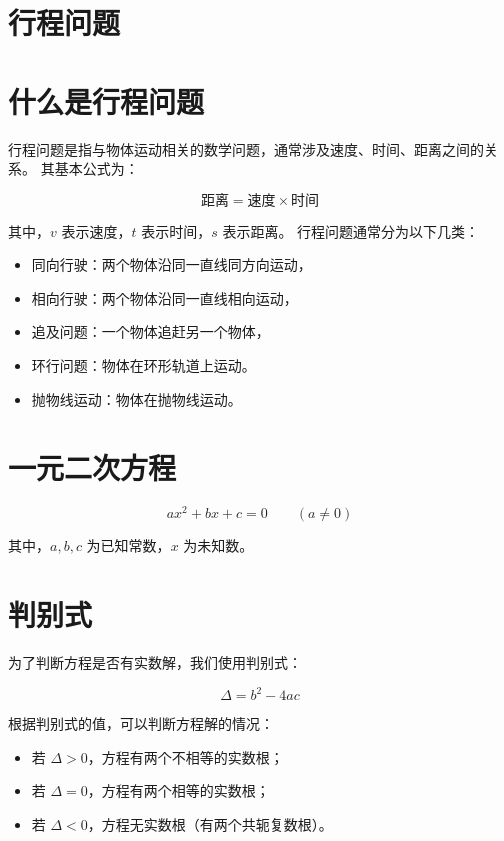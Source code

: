 \documentclass[12pt]{article}
\begin{document}

\section*{行程问题}


\section{什么是行程问题}

行程问题是指与物体运动相关的数学问题，通常涉及速度、时间、距离之间的关系。
其基本公式为：


\[
  \text{距离} = \text{速度} \times \text{时间}
\]


其中，\(v\) 表示速度，\(t\) 表示时间，\(s\) 表示距离。
行程问题通常分为以下几类：
\begin{itemize}
\item 同向行驶：两个物体沿同一直线同方向运动，
\item 相向行驶：两个物体沿同一直线相向运动，
\item 追及问题：一个物体追赶另一个物体，
\item 环行问题：物体在环形轨道上运动。
\item 抛物线运动：物体在抛物线运动。
\end{itemize}
\section{一元二次方程}
\[
  ax^2 + bx + c = 0 \qquad (a \neq 0)
\]


其中，\(a, b, c\) 为已知常数，\(x\) 为未知数。

\section{判别式}

为了判断方程是否有实数解，我们使用判别式：


\[
  \Delta = b^2 - 4ac
\]



根据判别式的值，可以判断方程解的情况：
\begin{itemize}
  \item 若 \(\Delta > 0\)，方程有两个不相等的实数根；
  \item 若 \(\Delta = 0\)，方程有两个相等的实数根；
  \item 若 \(\Delta < 0\)，方程无实数根（有两个共轭复数根）。
\end{itemize}
\end{document}
